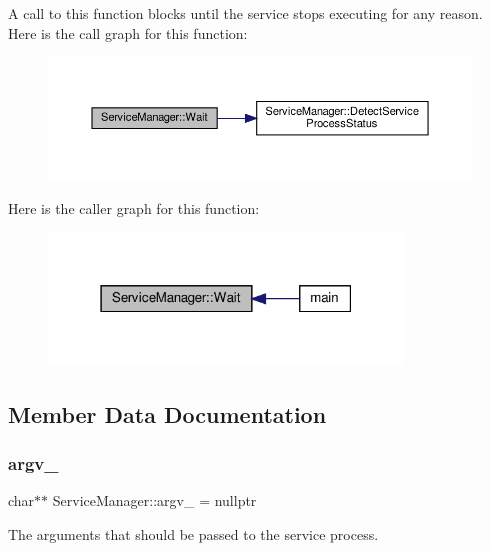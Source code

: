 A call to this function blocks until the service stops executing for any reason. Here is the call graph for this function\+:
\nopagebreak
\begin{figure}[H]
\begin{center}
\leavevmode
\includegraphics[width=350pt]{classServiceManager_abc19f11c2147855029dad4c4ce4de0d7_cgraph}
\end{center}
\end{figure}
Here is the caller graph for this function\+:
\nopagebreak
\begin{figure}[H]
\begin{center}
\leavevmode
\includegraphics[width=267pt]{classServiceManager_abc19f11c2147855029dad4c4ce4de0d7_icgraph}
\end{center}
\end{figure}


\subsection{Member Data Documentation}
\mbox{\label{classServiceManager_a174f797da9bf2b3d81444ed1c743b7b2}} 
\subsubsection{\texorpdfstring{argv\+\_\+}{argv\_}}
{\footnotesize\ttfamily char$\ast$$\ast$ Service\+Manager\+::argv\+\_\+ = nullptr\hspace{0.3cm}{\ttfamily [private]}}

The arguments that should be passed to the service process. \mbox{\label{classServiceManager_afd71696bbf522fb6828c6145cf769db9}} 
